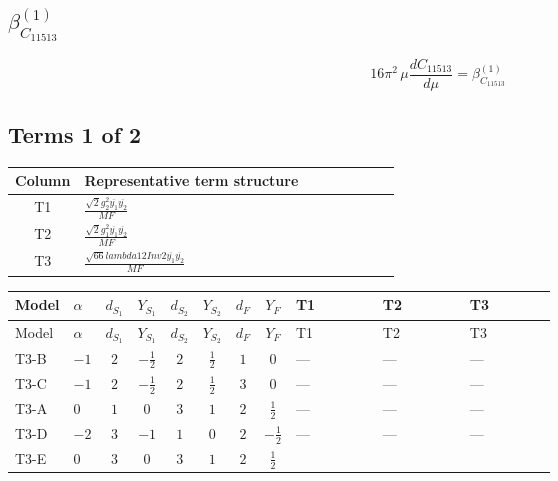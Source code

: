 \documentclass[8pt]{article}
\begin{document}
\begin{landscape}
\section*{$\beta_{C_{11513}}^{(1)}$}
\[16\pi^2\,\mu\frac{d C_{11513}}{d\mu}=\beta_{C_{11513}}^{(1)}\]
\subsection*{Terms 1 of 2}
\begin{center}
\begin{tabular}{@{}c >{\raggedright\arraybackslash}p{0.82\linewidth}@{}}
\toprule
Column & Representative term structure \\
\midrule
T1 & \(\displaystyle \frac{\sqrt{2} g_{2}^{2} \overline{y_{1}} \overline{y_{2}}}{MF}\) \\
\midrule
T2 & \(\displaystyle \frac{\sqrt{2} g_{1}^{2} \overline{y_{1}} \overline{y_{2}}}{MF}\) \\
\midrule
T3 & \(\displaystyle \frac{\sqrt{66} lambda12Inv2 \overline{y_{1}} \overline{y_{2}}}{MF}\) \\
\midrule
\bottomrule
\end{tabular}
\end{center}
\smallskip
\tiny
\begin{longtable}{@{}llcccccc >{\raggedright\arraybackslash}p{0.21\linewidth} >{\raggedright\arraybackslash}p{0.21\linewidth} >{\raggedright\arraybackslash}p{0.21\linewidth}@{}}
\toprule
Model & $\alpha$ & $d_{S_1}$ & $Y_{S_1}$ & $d_{S_2}$ & $Y_{S_2}$ & $d_F$ & $Y_F$ & T1 & T2 & T3 \\
\midrule
\endfirsthead
\toprule
Model & $\alpha$ & $d_{S_1}$ & $Y_{S_1}$ & $d_{S_2}$ & $Y_{S_2}$ & $d_F$ & $Y_F$ & T1 & T2 & T3 \\
\midrule
\endhead
T3-B & $-1$ & $2$ & $-\frac{1}{2}$ & $2$ & $\frac{1}{2}$ & $1$ & $0$ & --- & --- & --- \\
\midrule
T3-C & $-1$ & $2$ & $-\frac{1}{2}$ & $2$ & $\frac{1}{2}$ & $3$ & $0$ & --- & --- & --- \\
\midrule
T3-A & $0$ & $1$ & $0$ & $3$ & $1$ & $2$ & $\frac{1}{2}$ & --- & --- & --- \\
\midrule
T3-D & $-2$ & $3$ & $-1$ & $1$ & $0$ & $2$ & $-\frac{1}{2}$ & --- & --- & --- \\
\midrule
T3-E & $0$ & $3$ & $0$ & $3$ & $1$ & $2$ & $\frac{1}{2}$ & \scriptsize\adjustbox{max width=\linewidth}{$\begin{gathered} - \frac{33 \sqrt{2} g_{2}^{2} \overline{y_{1}} \overline{y_{2}}}{16 MF}\end{gathered}$} & \scriptsize\adjustbox{max width=\linewidth}{$\begin{gathered} - \frac{3 \sqrt{2} g_{1}^{2} \overline{y_{1}} \overline{y_{2}}}{16 MF}\end{gathered}$} & \scriptsize\adjustbox{max width=\linewidth}{$\begin{gathered} - \frac{3 \sqrt{66} lambda12Inv2 \overline{y_{1}} \overline{y_{2}}}{44 MF}\end{gathered}$} \\
\midrule
\bottomrule
\end{longtable}
\clearpage

\end{landscape}
\end{document}
